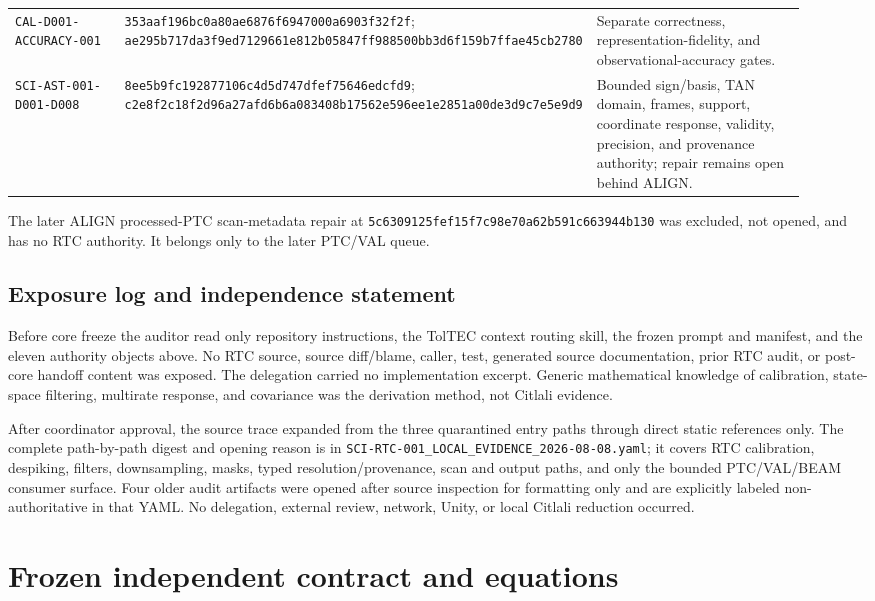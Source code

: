 \documentclass[11pt]{article}
\newcommand{\code}[1]{\nolinkurl{#1}}
\begin{document}
\begin{longtable}{@{}L{0.20\linewidth}L{0.25\linewidth}L{0.47\linewidth}@{}}
\code{CAL-D001-ACCURACY-001} & \code{353aaf196bc0a80ae6876f6947000a6903f32f2f}; \code{ae295b717da3f9ed7129661e812b05847ff988500bb3d6f159b7ffae45cb2780} & Separate correctness, representation-fidelity, and observational-accuracy gates. \\
\code{SCI-AST-001-D001-D008} & \code{8ee5b9fc192877106c4d5d747dfef75646edcfd9}; \code{c2e8f2c18f2d96a27afd6b6a083408b17562e596ee1e2851a00de3d9c7e5e9d9} & Bounded sign/basis, TAN domain, frames, support, coordinate response, validity, precision, and provenance authority; repair remains open behind ALIGN. \\
\bottomrule
\end{longtable}

The later ALIGN processed-PTC scan-metadata repair at
\code{5c6309125fef15f7c98e70a62b591c663944b130} was excluded, not opened,
and has no RTC authority.  It belongs only to the later PTC/VAL queue.

\subsection{Exposure log and independence statement}

Before core freeze the auditor read only repository instructions, the TolTEC
context routing skill, the frozen prompt and manifest, and the eleven authority
objects above.  No RTC source, source diff/blame, caller, test, generated source
documentation, prior RTC audit, or post-core handoff content was exposed.  The
delegation carried no implementation excerpt.  Generic mathematical knowledge
of calibration, state-space filtering, multirate response, and covariance was
the derivation method, not Citlali evidence.

After coordinator approval, the source trace expanded from the three
quarantined entry paths through direct static references only.  The complete
path-by-path digest and opening reason is in
\code{SCI-RTC-001_LOCAL_EVIDENCE_2026-08-08.yaml}; it covers RTC calibration,
despiking, filters, downsampling, masks, typed resolution/provenance, scan and
output paths, and only the bounded PTC/VAL/BEAM consumer surface.  Four older
audit artifacts were opened after source inspection for formatting only and
are explicitly labeled non-authoritative in that YAML.  No delegation,
external review, network, Unity, or local Citlali reduction occurred.

\section{Frozen independent contract and equations}
\end{document}
